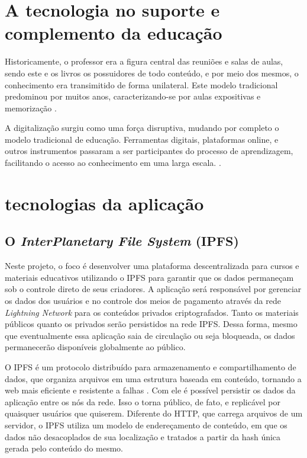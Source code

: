 \section{A tecnologia no suporte e complemento da educação}

Historicamente, o professor era a figura central das reuniões e salas de aulas, sendo este e os livros os possuidores de todo conteúdo, e por meio dos mesmos, o conhecimento era transimitido de forma unilateral. Este modelo tradicional predominou por muitos anos, caracterizando-se por aulas expositivas e memorização \cite{unicep2024}.

A digitalização surgiu como uma força disruptiva, mudando por completo o modelo tradicional de educação. Ferramentas digitais, plataformas online, e outros instrumentos passaram a ser participantes do processo de aprendizagem, facilitando o acesso ao conhecimento em uma larga escala. \cite{unicep2024}.

\section{tecnologias da aplicação}

\subsection{O \textit{InterPlanetary File System} (IPFS)}

Neste projeto, o foco é desenvolver uma plataforma descentralizada para cursos e materiais educativos utilizando o IPFS para garantir que os dados permaneçam sob o controle direto de seus criadores. A aplicação será responsável por gerenciar os dados dos usuários e no controle dos meios de pagamento através da rede \textit{Lightning Network} \cite{lightningnetwork} para os conteúdos privados criptografados. Tanto os materiais públicos quanto os privados serão persistidos na rede IPFS. Dessa forma, mesmo que eventualmente essa aplicação saia de circulação ou seja bloqueada, os dados permanecerão disponíveis globalmente ao público.

O IPFS é um protocolo distribuído para armazenamento e compartilhamento de dados, que organiza arquivos em uma estrutura baseada em conteúdo, tornando a web mais eficiente e resistente a falhas \cite{ipfs2025}. Com ele é possível persistir os dados da aplicação entre os nós da rede. Isso o torna público, de fato, e replicável por quaisquer usuários que quiserem. Diferente do HTTP, que carrega arquivos de um servidor, o IPFS utiliza um modelo de endereçamento de conteúdo, em que os dados não desacoplados de sua localização e tratados a partir da hash única gerada pelo conteúdo do mesmo.

